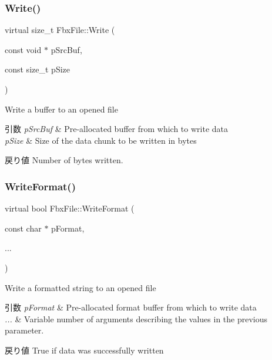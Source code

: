 \subsubsection{\texorpdfstring{Write()}{Write()}}
{\footnotesize\ttfamily virtual size\+\_\+t Fbx\+File\+::\+Write (\begin{DoxyParamCaption}\item[{const void $\ast$}]{p\+Src\+Buf,  }\item[{const size\+\_\+t}]{p\+Size }\end{DoxyParamCaption})\hspace{0.3cm}{\ttfamily [virtual]}}

Write a buffer to an opened file 
\begin{DoxyParams}{引数}
{\em p\+Src\+Buf} & Pre-\/allocated buffer from which to write data \\
\hline
{\em p\+Size} & Size of the data chunk to be written in bytes \\
\hline
\end{DoxyParams}
\begin{DoxyReturn}{戻り値}
Number of bytes written. 
\end{DoxyReturn}
\mbox{\label{class_fbx_file_a64271cf33bdcd55d35502cd46ab910a5}} 
\subsubsection{\texorpdfstring{Write\+Format()}{WriteFormat()}}
{\footnotesize\ttfamily virtual bool Fbx\+File\+::\+Write\+Format (\begin{DoxyParamCaption}\item[{const char $\ast$}]{p\+Format,  }\item[{}]{... }\end{DoxyParamCaption})\hspace{0.3cm}{\ttfamily [virtual]}}

Write a formatted string to an opened file 
\begin{DoxyParams}{引数}
{\em p\+Format} & Pre-\/allocated format buffer from which to write data \\
\hline
{\em ...} & Variable number of arguments describing the values in the previous parameter. \\
\hline
\end{DoxyParams}
\begin{DoxyReturn}{戻り値}
True if data was successfully written 
\end{DoxyReturn}


